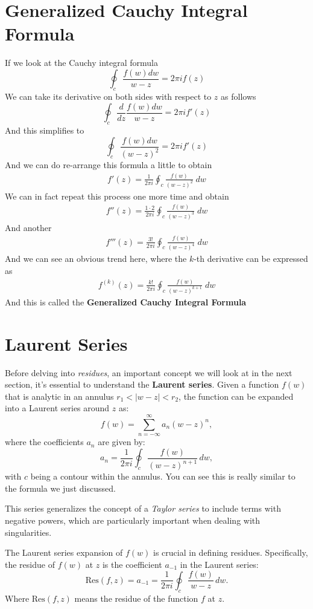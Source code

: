 \documentclass[12pt]{book}
\newcommand{\dydx}[2]{\frac{d #1}{d #2}}
\begin{document}
\section{Generalized Cauchy Integral Formula}
If we look at the Cauchy integral formula
\[
\oint_c \frac{f(w)dw}{w-z} = 2\pi i f(z)
\]
We can take its derivative on both sides with respect to $z$ as follows
\[
\oint_c \dydx{}{z} \frac{f(w)dw}{w-z} = 2\pi i f'(z)
\]
And this simplifies to
\[
\oint_c \frac{f(w)dw}{(w-z)^2} = 2 \pi i f'(z)
\]
And we can do re-arrange this formula a little to obtain
\begin{align}
    f'(z) = \frac{1}{2\pi i }\oint_c \frac{f(w)}{(w-z)^2}\;dw
\end{align}
We can in fact repeat this process one more time and obtain
\begin{align}
    f''(z) = \frac{1\cdot 2}{2\pi i}\oint_c \frac{f(w)}{(w-z)^3}\;dw
\end{align}
And another
\begin{align}
    f'''(z) = \frac{3!}{2\pi i} \oint_c \frac{f(w)}{(w-z)^4}\;dw
\end{align}
And we can see an obvious trend here, where the $k$-th derivative can be expressed as
\begin{align}
    f^{(k)}(z) = \frac{k!}{2\pi i}\oint_c \frac{f(w)}{(w-z)^{k+1}}\;dw
\end{align}
And this is called the \textbf{Generalized Cauchy Integral Formula}

\section{Laurent Series}

Before delving into \textit{residues}, an important concept we will look at in the next section, it's essential to understand the \textbf{Laurent series}. Given a function \(f(w)\) that is analytic in an annulus \(r_1 < |w - z| < r_2\), the function can be expanded into a Laurent series around \(z\) as:
\[
f(w) = \sum_{n=-\infty}^{\infty} a_n (w - z)^n,
\]
where the coefficients \(a_n\) are given by:
\[
a_n = \frac{1}{2\pi i} \oint_{c} \frac{f(w)}{(w - z)^{n+1}}\, dw,
\]
with \(c\) being a contour within the annulus. You can see this is really similar to the formula we just discussed.

This series generalizes the concept of a \textit{Taylor series} to include terms with negative powers, which are particularly important when dealing with singularities.


The Laurent series expansion of \(f(w)\) is crucial in defining residues. Specifically, the residue of \(f(w)\) at \(z\) is the coefficient \(a_{-1}\) in the Laurent series:
\[
\text{Res}(f, z) = a_{-1} = \frac{1}{2\pi i} \oint_{c} \frac{f(w)}{w - z} \, dw.
\]
Where $\text{Res}(f,z)$ means the residue of the function $f$ at $z$. 
\end{document}
